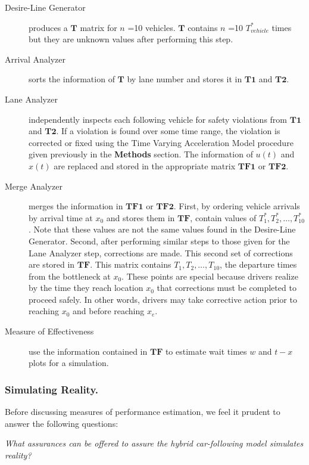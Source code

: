 \documentclass[Proceedings]{ascelike}
\begin{document}
\begin{description}
\item [ Desire-Line Generator] produces a $\mathbf{T}$ matrix for $n$ =10 vehicles. $\mathbf{T}$ contains $n$ =10  $T_{vehicle}^*$ times but they are unknown values after performing this step.
\item [ Arrival Analyzer] sorts the information of $\mathbf{T}$ by lane number and stores it in $\mathbf{T1}$ and  $\mathbf{T2}$.
\item [ Lane Analyzer] independently inspects each following vehicle for safety violations from $\mathbf{T1}$ and  $\mathbf{T2}$. If a violation is found over some time range, the violation is corrected or fixed using the Time Varying Acceleration Model procedure given previously in the \textbf{Methods} section.  The information of $u(t)$ and $x(t)$  are replaced and stored in   the appropriate matrix $\mathbf{TF1}$ or  $\mathbf{TF2}$.
\item [ Merge Analyzer] merges the information in $\mathbf{TF1}$ or  $\mathbf{TF2}$. First, by ordering vehicle arrivals by arrival time at $x_0$ and stores them in $\mathbf{TF}$, contain values of  $T^*_1, T^*_2,\ldots,T^*_{10}$. Note that these values are  not the same values found in the Desire-Line Generator. Second, after performing similar steps to those given for the  Lane Analyzer step, corrections are made. This second set of corrections are stored in $\mathbf{TF}$. This matrix contains $T_1, T_2,\ldots,T_{10}$, the departure times from the bottleneck at $x_0$. These points are special because drivers realize by the time they reach location $x_0$ that corrections must be completed to proceed safely. In other words, drivers may take corrective action prior to reaching $x_0$ and before reaching $x_e$. 

\item [ Measure of Effectiveness] use the information contained in $\mathbf{TF}$ to estimate wait times $w$ and $t-x$ plots for a simulation.
\end{description}

\subsubsection{Simulating Reality.} 

Before discussing  measures of performance estimation, we feel it prudent to answer the following questions: 

\noindent \emph{What assurances can be offered to assure the hybrid car-following model simulates reality? }
\end{document}

